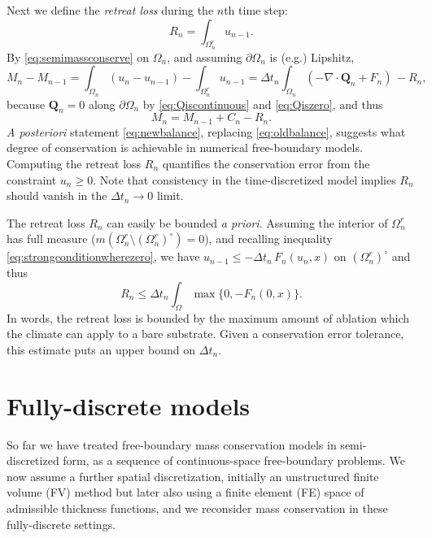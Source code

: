 \documentclass[final,onefignum]{siamart190516}
\newcommand\bQ{\mathbf{Q}}
\newcommand{\Div}{\nabla\cdot}
\begin{document}
Next we define the \emph{retreat loss} during the $n$th time step:
\begin{equation}
R_n = \int_{\Omega_n^r} u_{n-1}. \label{eq:retreatlossseries}
\end{equation}
By \eqref{eq:semimassconserve} on $\Omega_n$, and assuming $\partial \Omega_n$ is (e.g.) Lipshitz,
    $$M_n - M_{n-1} = \int_{\Omega_n} (u_n - u_{n-1}) - \int_{\Omega_n^r} u_{n-1} = \Delta t_n \int_{\Omega_n} (- \Div \bQ_n + F_n) \, - R_n,$$
because $\bQ_n=0$ along $\partial \Omega_n$ by \eqref{eq:Qiscontinuous} and \eqref{eq:Qiszero}, and thus
\begin{equation}
M_n = M_{n-1} + C_n - R_n. \label{eq:newbalance}
\end{equation}
\emph{A posteriori} statement \eqref{eq:newbalance}, replacing \eqref{eq:oldbalance}, suggests what degree of conservation is achievable in numerical free-boundary models.  Computing the retreat loss $R_n$ quantifies the conservation error from the constraint $u_n\ge 0$.  Note that consistency in the time-discretized model implies $R_n$ should vanish in the $\Delta t_n\to 0$ limit.

The retreat loss $R_n$ can easily be bounded \emph{a priori}.  Assuming the interior of $\Omega_n^r$ has full measure ($m(\Omega_n^r \setminus (\Omega_n^r)^\circ)=0$), and recalling inequality \eqref{eq:strongconditionwherezero}, we have $u_{n-1} \le -\Delta t_n\,F_n(u_n,x)$ on $(\Omega_n^r)^\circ$ and thus
\begin{equation}
R_n \le \Delta t_n \int_\Omega \max\{0,-F_n(0,x)\}. \label{eq:retreatbound}
\end{equation}
In words, the retreat loss is bounded by the maximum amount of ablation which the climate can apply to a bare substrate.  Given a conservation error tolerance, this estimate puts an upper bound on $\Delta t_n$.


\section{Fully-discrete models}  \label{sec:spacediscretized}

So far we have treated free-boundary mass conservation models in semi-discretized form, as a sequence of continuous-space free-boundary problems.  We now assume a further spatial discretization, initially an unstructured finite volume (FV) method \cite{LeVeque2002} but later also using a finite element (FE) space of admissible thickness functions, and we reconsider mass conservation in these fully-discrete settings.
\end{document}
